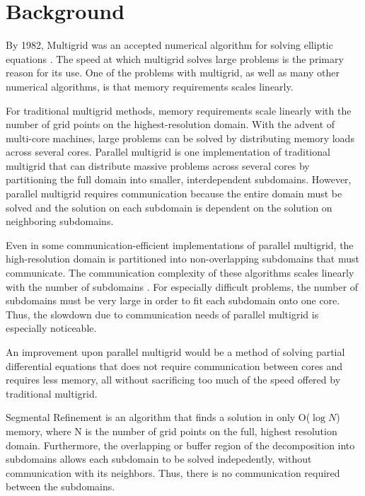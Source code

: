 \documentclass[final]{siamart1116}
\numberwithin{theorem}{section}
\begin{document}
\section{Background}\label{sec:backg}
By 1982, Multigrid was an accepted numerical algorithm for solving elliptic equations \cite{earlymulti}. The speed at which multigrid solves large problems is the primary reason for its use. One of the problems with multigrid, as well as many other numerical algorithms, is that memory requirements scales linearly. 
    
    For traditional multigrid methods, memory requirements scale linearly with the number of grid points on the highest-resolution domain. With the advent of multi-core machines, large problems can be solved by distributing memory loads across several cores. Parallel multigrid is one implementation of traditional multigrid that can distribute massive problems across several cores by partitioning the full domain into smaller, interdependent subdomains. However, parallel multigrid requires communication \cite{brandtdiskin} because the entire domain must be solved and the solution on each subdomain is dependent on the solution on neighboring subdomains.
    
    Even in some communication-efficient implementations of parallel multigrid, the high-resolution domain is partitioned into non-overlapping subdomains that must communicate. The  communication complexity of these algorithms scales linearly with the number of subdomains \cite{parallelcomm}. For especially difficult problems, the number of subdomains must be very large in order to fit each subdomain onto one core. Thus, the slowdown due to communication needs of parallel multigrid is especially noticeable. 
    
    An improvement upon parallel multigrid would be a method of solving partial differential equations that does not require communication between cores and requires less memory, all without sacrificing too much of the speed offered by traditional multigrid. 
    
    Segmental Refinement is an algorithm that finds a solution in only O($\log{N}$) memory, where N is the number of grid points on the full, highest resolution domain. Furthermore, the overlapping or buffer region of the decomposition into subdomains allows each subdomain to be solved indepedently, without communication with its neighbors. Thus, there is no communication required between the subdomains.
    	
\end{document}
